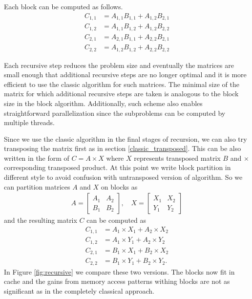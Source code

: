 \documentclass[a4paper,11pt]{article}
\begin{document}
Each block can be computed as follows.
\begin{align*}
C_{1,1} &= A_{1,1}B_{1,1} + A_{1,2}B_{2,1} \\
C_{1,2} &= A_{1,1}B_{1,2} + A_{1,2}B_{2,2} \\
C_{2,1} &= A_{2,1}B_{1,1} + A_{2,2}B_{2,1} \\
C_{2,2} &= A_{1,2}B_{1,2} + A_{2,2}B_{2,2}
\end{align*}

Each recursive step reduces the problem size and eventually the matrices are small enough that additional recursive steps are no longer optimal and it is more efficient to use the classic algorithm for such matrices. The minimal size of the matrix for which additional recursive steps are taken is analogous to the block size in the block algorithm. Additionally, such scheme also enables straightforward parallelization since the subproblems can be computed by multiple threads.

Since we use the classic algorithm in the final stages of recursion, we can also try transposing the matrix first as in section \ref{classic_transposed}. 
This can be also written in the form of $C = A \times X$ where $X$ represents transposed matrix $B$ and $\times$ corresponding transposed product. 
At this point we write block partition in different style to avoid confusion with untransposed version of algorithm. 
So we can partition matrices $A$ and $X$ on blocks as
\begin{align*}
A = 
\begin{bmatrix}
A_{1} & A_{2} \\
B_{1} & B_{2}
\end{bmatrix},
\quad
X = 
\begin{bmatrix}
X_{1} & X_{2} \\
Y_{1} & Y_{2}
\end{bmatrix}
\end{align*}
and the resulting matrix $C$ can be computed as
\begin{align*}
C_{1,1} &= A_{1} \times X_{1} + A_{2}  \times X_{2} \\
C_{1,2} &= A_{1} \times Y_{1} + A_{2}  \times Y_{2} \\
C_{2,1} &= B_{1} \times X_{1} + B_{2}  \times X_{2} \\
C_{2,2} &= B_{1} \times Y_{1} + B_{2}  \times Y_{2}.
\end{align*}
In Figure \ref{fig:recursive} we compare these two versions. The blocks now fit in cache and the gains from memory access patterns withing blocks are not as significant as in the completely classical approach.
\end{document}
